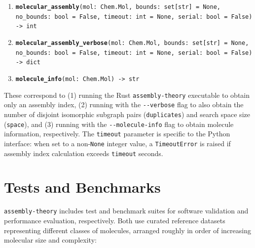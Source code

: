 \documentclass[acmsmall,nonacm,screen]{acmart}  %
\begin{document}
\begin{enumerate}
    \item \textbf{\texttt{molecular\_assembly}}\texttt{(mol: Chem.Mol, bounds: set[str] = None, no\_bounds: bool = False, timeout: int = None, serial: bool = False) -> int}
    \item \textbf{\texttt{molecular\_assembly\_verbose}}\texttt{(mol: Chem.Mol, bounds: set[str] = None, no\_bounds: bool = False, timeout: int = None, serial: bool = False) -> dict}
    \item \textbf{\texttt{molecule\_info}}\texttt{(mol: Chem.Mol) -> str}
\end{enumerate}

These correspond to (1) running the Rust \texttt{assembly-theory} executable to obtain only an assembly index, (2) running with the \verb|--verbose| flag to also obtain the number of disjoint isomorphic subgraph pairs (\texttt{duplicates}) and search space size (\texttt{space}), and (3) running with the \verb|--molecule-info| flag to obtain molecule information, respectively.
The \texttt{timeout} parameter is specific to the Python interface: when set to a non-\texttt{None} integer value, a \texttt{TimeoutError} is raised if assembly index calculation exceeds \texttt{timeout} seconds.




\section{Tests and Benchmarks} \label{sec:testbench}

\texttt{assembly-theory} includes test and benchmark suites for software validation and performance evaluation, respectively.
Both use curated reference datasets representing different classes of molecules, arranged roughly in order of increasing molecular size and complexity:
\end{document}
